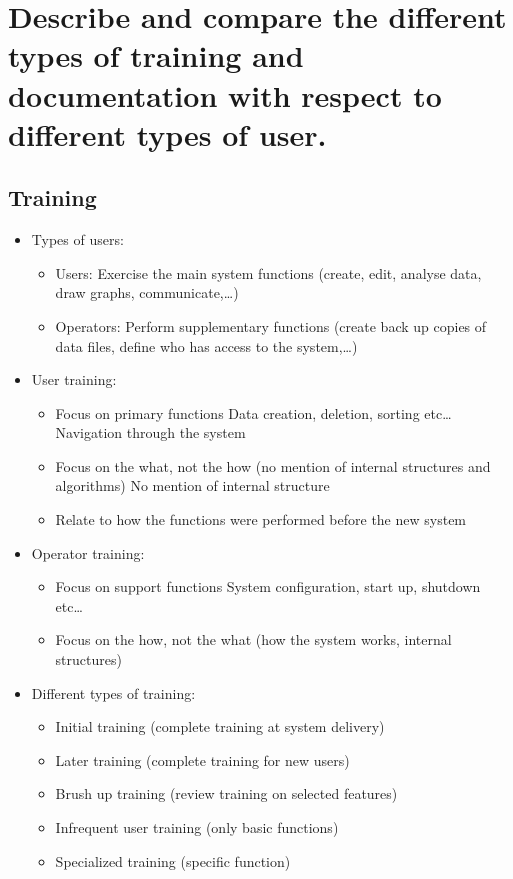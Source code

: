 \clearpage{}
\section{Describe and compare the different types of training and
documentation with respect to different types of user.}


\subsection{Training}

\begin{itemize}
        
\item Types of users:

\begin{itemize}
    \item Users: Exercise the main system functions (create, edit, analyse data, draw graphs, communicate,\ldots)
    \item Operators: Perform supplementary functions (create back up copies of data files, define who has access to the system,\ldots)
\end{itemize}

\item User training:

\begin{itemize}
    \item Focus on primary functions
        \subitem{} Data creation, deletion, sorting etc\ldots
        \subitem{} Navigation through the system
    \item Focus on the what, not the how (no mention of internal structures and algorithms)
        \subitem{} No mention of internal structure
    \item Relate to how the functions were performed before the new system
\end{itemize}

\item Operator training:

\begin{itemize}
    \item Focus on support functions
        \subitem{} System configuration, start up, shutdown etc\ldots
    \item Focus on the how, not the what (how the system works, internal structures)
\end{itemize}

\item Different types of training:

\begin{itemize}
    \item Initial training (complete training at system delivery)
    \item Later training (complete training for new users)
    \item Brush up training (review training on selected features)
    \item Infrequent user training (only basic functions)
    \item Specialized training (specific function)
\end{itemize}
\end{itemize}

